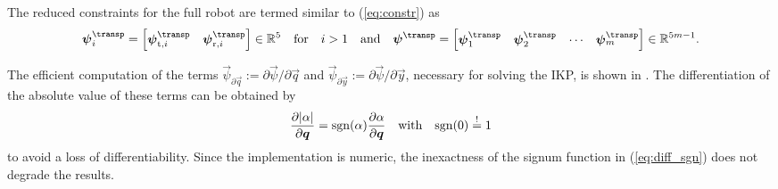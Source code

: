\documentclass[
	graybox,
	vecphys] %
	{svmult}
\newcommand{\Res}[0]{\vec{\delta}}
\newcommand{\vecResR}[0]{\vec{\psi}}
\begin{document}
The reduced constraints for the full robot are termed similar to (\ref{eq:constr}) as
%
\vspace{-0.1cm}
\begin{equation}
\vecResR_i^\transp=\begin{bmatrix}
\vecResR_{\mathrm{t},i}^\transp & \vecResR_{\mathrm{r},i}^\transp
\end{bmatrix} \in {\mathbb{R}}^{5}
\quad \mathrm{for} \quad i>1
\quad \mathrm{and} \quad
\vecResR^\transp
=
\begin{bmatrix}
\vecResR_1^\transp &
\vecResR_2^\transp &
\cdots &
\vecResR_m^\transp
\end{bmatrix} \in {\mathbb{R}}^{5m-1}.
\label{eq:constr_red}
\vspace{-0.1cm}
\end{equation}


The efficient computation of the 
terms $\vecResR_{\partial \vec{q}}{:=}\partial  \vecResR / \partial \vec{q}$ %
and
$\vecResR_{\partial \vec{y}}{:=}\partial \vecResR / \partial \vec{y}$,
necessary for solving the IKP,
is shown in \cite{SchapplerTapOrt2019}.
The differentiation of the absolute value of these terms can be obtained by
%
\vspace{-0.1cm}
\begin{equation}
\frac{\partial |\alpha|}{\partial \vec{q}}=\mathrm{sgn}(\alpha)\frac{\partial \alpha}{\partial \vec{q}}
\quad \mathrm{with} \quad
\mathrm{sgn}(0) \overset{!}{=} 1
\label{eq:diff_sgn}
\vspace{-0.1cm}
\end{equation}
%
to avoid a loss of differentiability.
Since the implementation is numeric, the inexactness of the signum function in (\ref{eq:diff_sgn}) does not degrade the results.


\end{document}
